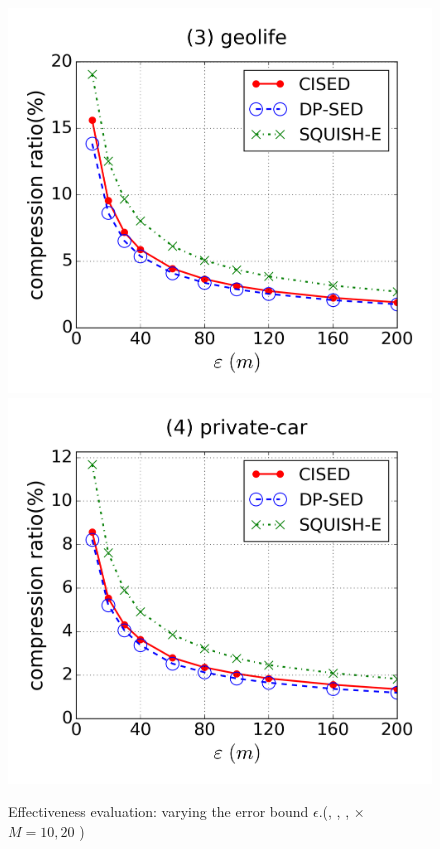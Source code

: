 \begin{figure}[tb!]
\includegraphics[scale = 0.25]{figures/Exp-cr-epsilon-geolife.png}
\includegraphics[scale = 0.25]{figures/Exp-cr-epsilon-private.png}
\vspace{-3ex}
\caption{\small Effectiveness evaluation: varying the error bound $\epsilon$.(\cist, \cista, \dpa, \squishe  $\times$ $M = 10, {20}$ )}
\label{fig:cr}
\vspace{-1.0ex}
\end{figure}


